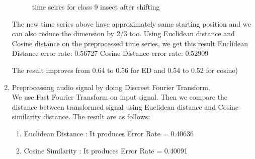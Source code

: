 \begin{enumerate}
\begin{figure}[H]
\caption{time seires for class 9 insect after shifting}
\end{figure}
The new time series above have approximately same starting position and we can also reduce the dimension by 2/3 too. Using Euclidean distance and Cosine distance on the preprocessed time series, we get this result
Euclidean Distance error rate: 0.56727
Cosine Distance error rate: 0.52909 

The result improves from 0.64 to 0.56 for ED and 0.54 to 0.52 for cosine)


\item Preprocessing audio signal by doing Discreet Fourier Transform.\\

We use Fast Fourier Transform on input signal. Then we compare the distance between transformed signal using Euclidean distance and Cosine similarity distance. The result are as follows: 

\begin{enumerate}
\item Euclidean Distance : It produces Error Rate = 0.40636
\item Cosine Similarity : It produces Error Rate = 0.40091
\end{enumerate}


\end{enumerate}
